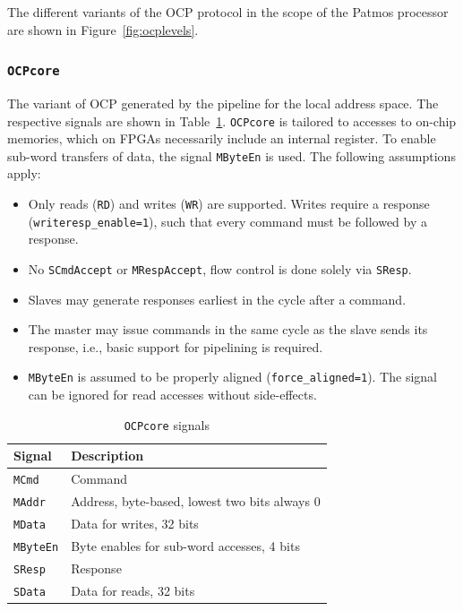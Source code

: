 \documentclass[a4paper,fontsize=10pt,twoside,DIV15,BCOR12mm,headinclude=true,footinclude=false,pagesize,bibtotoc]{scrbook}
\newcommand{\code}[1]{{\texttt{#1}}}
\begin{document}
The different variants of the OCP protocol in the scope of the Patmos
processor are shown in Figure~\ref{fig:ocplevels}.

\subsubsection{\code{OCPcore}}

The variant of OCP generated by the pipeline for the local address
space. The respective signals are shown in
Table~\ref{tab:coresignals}. \code{OCPcore} is tailored to accesses to
on-chip memories, which on FPGAs necessarily include an internal
register. To enable sub-word transfers of data, the signal
\code{MByteEn} is used. The following assumptions apply:
\begin{itemize}
\item Only reads (\code{RD}) and writes (\code{WR}) are
  supported. Writes require a response (\code{writeresp\_enable=1}),
  such that every command must be followed by a response.
\item No \code{SCmdAccept} or \code{MRespAccept}, flow control is done
  solely via \code{SResp}.
\item Slaves may generate responses earliest in the cycle after a
  command.
\item The master may issue commands in the same cycle as the slave
  sends its response, i.e., basic support for pipelining is required.
\item \code{MByteEn} is assumed to be properly aligned
  (\code{force\_aligned=1}). The signal can be ignored for read
  accesses without side-effects.
\end{itemize}

\begin{table}
  \centering
  \caption{\code{OCPcore} signals}
  \label{tab:coresignals}
  \begin{tabular}{ll}
    \toprule
    Signal & Description \\
    \midrule
    \code{MCmd} & Command \\
    \code{MAddr} & Address, byte-based, lowest two bits always 0 \\
    \code{MData} & Data for writes, 32 bits \\
    \code{MByteEn} & Byte enables for sub-word accesses, 4 bits \\
    \cmidrule{1-2}
    \code{SResp} & Response \\
    \code{SData} & Data for reads, 32 bits \\
    \bottomrule
  \end{tabular}
\end{table}
\end{document}
